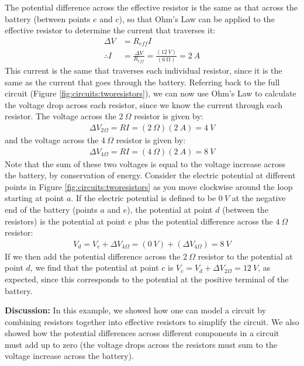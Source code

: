 \begin{example}
The potential difference across the effective resistor is the same as that across the battery (between points $e$ and $c$), so that Ohm's Law can be applied to the effective resistor to determine the current that traverses it:
\begin{align*}
\Delta V &= R_{eff}I\\
\therefore I&=\frac{\Delta V}{R_{eff}}=\frac{(\SI{12}{V})}{(\SI{6}{\ohm})}=\SI{2}{A}
\end{align*}
This current is the same that traverses each individual resistor, since it is the same as the current that goes through the battery. Referring back to the full circuit (Figure \ref{fig:circuits:tworesistors}), we can now use Ohm's Law to calculate the voltage drop across each resistor, since we know the current through each resistor. The voltage across the $\SI{2}{\Omega}$ resistor is given by:
\begin{align*}
\Delta V_{2\Omega}=RI=(\SI{2}{\Omega})(\SI{2}{A})=\SI{4}{V}
\end{align*}
and the voltage across the $\SI{4}{\Omega}$ resistor is given by:
\begin{align*}
\Delta V_{4\Omega}=RI=(\SI{4}{\Omega})(\SI{2}{A})=\SI{8}{V}
\end{align*}
Note that the sum of these two voltages is equal to the voltage increase across the battery, by conservation of energy. Consider the electric potential at different points in Figure \ref{fig:circuits:tworesistors} as you move clockwise around the loop starting at point $a$. If the electric potential is defined to be $\SI{0}{V}$ at the negative end of the battery (points $a$ and $e$), the potential at point $d$ (between the resistors) is the potential at point $e$ plus the potential difference across the $\SI{4}{\Omega}$ resistor:
\begin{align*}
V_d = V_e+\Delta V_{4\Omega}=(\SI{0}{V})+(\Delta V_{4\Omega})=\SI{8}{V}
\end{align*}
If we then add the potential difference across the $\SI{2}{\Omega}$ resistor to the potential at point $d$, we find  that the potential at point $c$ is $V_c=V_d+\Delta V_{2\Omega}=\SI{12}{V}$, as expected, since this corresponds to the potential at the positive terminal of the battery.

\textbf{Discussion: }In this example, we showed how one can model a circuit by combining resistors together into effective resistors to simplify the circuit. We also showed how the potential differences across different components in a circuit must add up to zero (the voltage drops across the resistors must sum to the voltage increase across the battery). 
\end{example}




